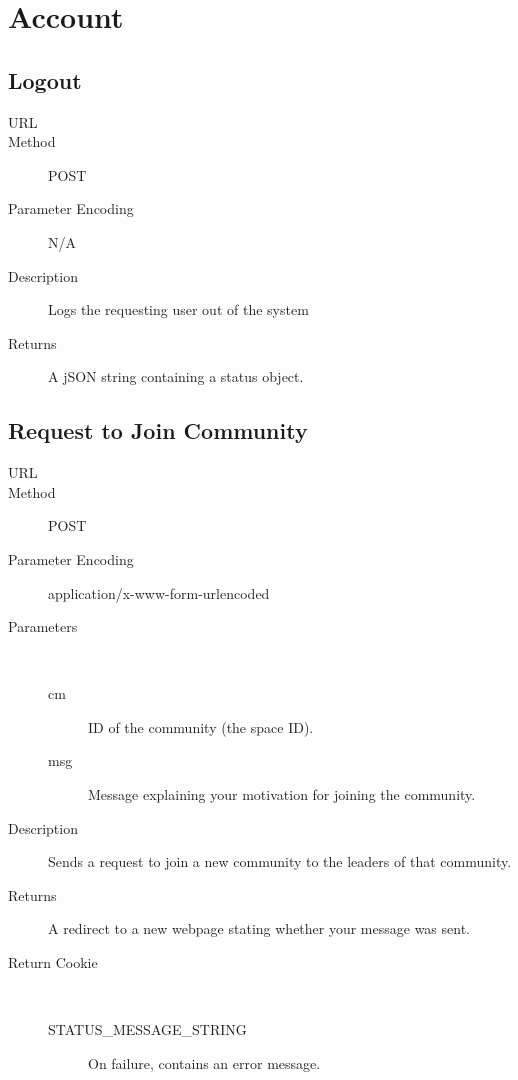 \chapter{Account}

\section{Logout}
\begin{description}
\item [URL] 
\item [Method] POST
\item [Parameter Encoding] N/A
\item [Description] Logs the requesting user out of the system
\item [Returns] A jSON string containing a status object.
\end{description}


\section{Request to Join Community}
\begin{description}
\item [URL] 
\item [Method] POST
\item [Parameter Encoding] application/x-www-form-urlencoded
\item [Parameters] \
	\begin{description}
	\item [cm]  ID of the community (the space ID).
	\item [msg]  Message explaining your motivation for joining the community.
	\end{description}
\item [Description] Sends a request to join a new community to the leaders of that community.
\item [Returns] A redirect to a new webpage stating whether your message was sent.
\item [Return Cookie] \
	\begin{description}
	\item [STATUS\_MESSAGE\_STRING]  On failure, contains an error message.
	\end{description}
\end{description}


